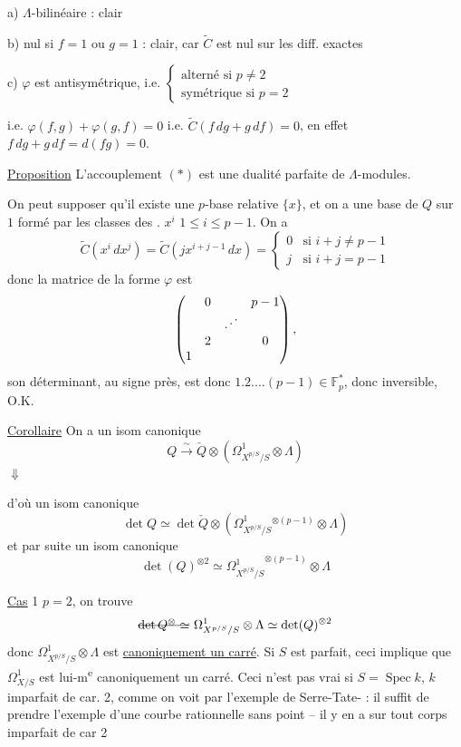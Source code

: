 a) $\Lambda$-bilinéaire : clair

b) nul si  $f=1$ ou $g=1$ : clair, car $\widetilde C$ est nul sur les diff. exactes

c) $\varphi$ est antisymétrique, i.e. $\left\{\begin{array}{l}\text{alterné si }p\ne2\\\text{symétrique si }p=2\end{array}\right.$

i.e. $\varphi(f,g)+\varphi(g,f)=0$ i.e. $\widetilde C(f\,dg+g\,df)=0$, en effet $f\,dg+g\,df=d(fg)=0$.

\uline{Proposition} L'accouplement $(\ast)$ est une dualité parfaite de $\Lambda$-modules.

On peut supposer qu'il existe une $p$-base relative $\{x\}$, et on a une base de $Q$ sur $1$ formé par les classes des . $x^i$ $1\le i\le p-1$. On a
\[
 \widetilde C(x^i\,dx^j)=\widetilde C(jx^{i+j-1}\,dx)=
 \begin{cases}0&\text{si }i+j\ne p-1\\j&\text{si }i+j=p-1\end{cases}
\]
donc la matrice de la forme $\varphi$ est
\[
 \begin{pmatrix}
 &0&&p-1\\
 &&\reflectbox{$\ddots$}&\\
 &2&&0\\
 1&&&
 \end{pmatrix},
\]
son déterminant, au signe près, est donc $1.2.\ldots(p-1)\in\mathbb F_p^\ast$,  donc inversible, O.K.

\uline{Corollaire}  On a un isom canonique
\[
 Q\xrightarrow{\sim}\check Q\otimes(\Omega^1_{X^{p/S}/S}\otimes\Lambda)
\]
$\Downarrow$

d'où un isom canonique
\[
 \det Q\simeq\det\check Q\otimes(\Omega^1_{X^{p/S}/S}{}^{\otimes(p-1)}\otimes\Lambda)
\]
et par suite un isom canonique
\[
 \det(Q)^{\otimes2}\simeq{\Omega^1_{X^{p/S}/S}}^{\otimes(p-1)}\otimes\Lambda
 \tag*{($\ast\ast$)}
\]

\uline{Cas} 1 \quad $p=2$, on trouve
\[
 \deleted{\det Q^{\otimes}\simeq}\ \Omega^1_{X^{p/S}/S}\otimes\Lambda\simeq\det(Q)^{\otimes2}
\]
donc $\Omega^1_{X^{p/S}/S}\otimes\Lambda$ est \uline{canoniquement un carré}. Si $S$ est parfait,  ceci implique que $\Omega^1_{X/S}$ est lui-m\textsuperscript{e} canoniquement un carré.    Ceci n'est pas vrai si $S=\operatorname{Spec}k$, $k$  imparfait de car. 2,  comme  on voit  par l'exemple de Serre-Tate- : il suffit de prendre l'exemple d'une courbe  rationnelle sans point --   il y en a sur tout corps imparfait de car 2

